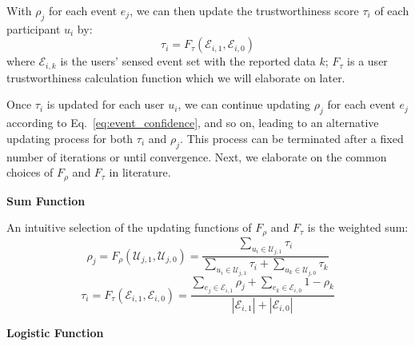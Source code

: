 With $\rho_j$ for each event $e_j$, we can then update the trustworthiness score $\tau_i$ of each participant $u_i$ by:
\begin{equation}
\tau_i = F_\tau(\mathcal E_{i,1}, \mathcal E_{i,0})
\end{equation}
where $\mathcal E_{i,k}$ is the users' sensed event set with the reported data $k$; $F_\tau$ is a user trustworthiness calculation function which we will elaborate on later.

Once $\tau_i$ is updated for each user $u_i$, we can continue updating $\rho_j$ for each event $e_j$ according to Eq.~\ref{eq:event_confidence}, and so on, leading to an alternative updating process for both $\tau_i$ and $\rho_j$. This process can be terminated after a fixed number of iterations or until convergence. Next, we elaborate on the common choices of $F_\rho$ and $F_\tau$ in literature.

\textbf{Sum Function}

An intuitive selection of the updating functions of $F_\rho$ and $F_\tau$ is the weighted sum:
\begin{equation}
\rho_j = F_\rho(\mathcal U_{j,1}, \mathcal U_{j,0}) = \frac{\sum_{u_i \in \mathcal U_{j,1}} \tau_i}{\sum_{u_i \in \mathcal U_{j,1}} \tau_i + \sum_{u_k \in \mathcal U_{j,0}} \tau_k}
\label{eq:rho_function_sum}
\end{equation}
\begin{equation}
\tau_i = F_\tau(\mathcal E_{i,1}, \mathcal E_{i,0}) = \frac{\sum_{e_j \in \mathcal E_{i,1}} \rho_j + \sum_{e_k \in \mathcal E_{i,0}} 1-\rho_k}{|\mathcal E_{i,1}|+|\mathcal E_{i,0}|}
\label{eq:tau_function}
\end{equation}

\textbf{Logistic Function}

